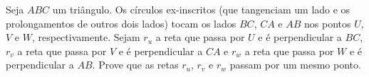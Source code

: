 Seja $ABC$ um triângulo. Os círculos ex-inscritos (que tangenciam um lado e os prolongamentos de outros dois lados) tocam os lados $BC$, $CA$ e $AB$ nos pontos $U$, $V$ e $W$, respectivamente. Sejam $r_u$ a reta que passa por $U$ e é perpendicular a $BC$, $r_v$ a reta que passa por $V$ e é perpendicular a $CA$ e $r_w$ a reta que passa por $W$ e é perpendicular a $AB$. Prove que as retas $r_u$, $r_v$ e $r_w$ passam por um mesmo ponto.
